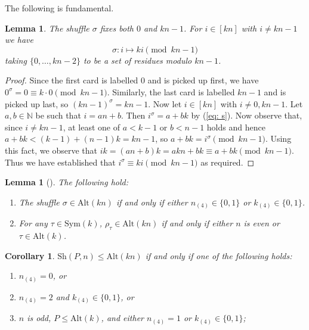 \documentclass[12pt]{amsart}
\newtheorem{cor}[thm]{Corollary}
\newtheorem{lem}[thm]{Lemma}
\theoremstyle{remark}
\theoremstyle{definition}
\newcommand{\sym}{\mathrm{Sym}}
\newcommand{\alt}{\mathrm{Alt}}
\newcommand{\sh}{\mathrm{Sh}}
\begin{document}

The following is fundamental.

\begin{lem} \cite[Proposition 1]{MM} \label{lem:shuffle acts}
The shuffle $\sigma$ fixes both $0$ and $kn-1$. For $i \in [kn]$ with $i \neq kn-1$ we have
 \[ \sigma : i \mapsto ki \pmod{kn-1} \]
taking $\{0, \dots, kn-2\}$ to be a set of residues modulo $kn-1$.
\end{lem}

\begin{proof}
Since the first card is labelled $0$ and is picked up first, we have $0^\sigma = 0 \equiv k \cdot 0 \pmod{kn-1}$. Similarly, the last card is labelled $kn-1$ and is picked up last, so $(kn-1)^\sigma = kn-1$. Now let $i \in [kn]$ with $i \neq 0, kn-1$. Let $a,b \in \mathbb{N}$ be such that $i = an+b$. Then $i^{\sigma} = a+bk$ by (\ref{eq: s}). Now observe that, since  $i \neq kn-1$, at least one of $a < k-1$ or $b < n-1$ holds and hence $a+bk < (k-1) + (n-1)k = kn-1$, so $a+bk = i^\sigma \pmod{kn-1}$. Using this fact, we observe that $ik = (an+b)k = akn + bk \equiv a + bk \pmod{kn-1}$. Thus we have established that $i^{\sigma} \equiv ki \pmod{kn-1}$ as required.
\end{proof}

\begin{lem}[{\cite[Lemmas 1 and 2]{MM}}]
\label{lem:parity} The following hold:
	\begin{enumerate}
	\item The shuffle $\sigma \in \alt(kn)$ if and only if either $n_{(4)} \in \{0,1\}$ or $k_{(4)} \in \{0,1\}$.
	\item For any $\tau \in \sym(k)$, $\rho_\tau \in \alt(kn)$ if and only if either $n$ is even or $\tau \in \alt(k)$.
	\end{enumerate}
\end{lem}

 
\begin{cor} \label{cor:parity}
$\sh(P,n) \leqslant \alt(kn)$ if and only if one of the following holds:
	\begin{enumerate}
	\item $n_{(4)} = 0$, or
	\item $n_{(4)} = 2$ and $k_{(4)} \in \{0,1\}$, or
	\item $n$ is odd, $P \leqslant \alt(k)$, and either $n_{(4)} = 1$ or $k_{(4)} \in \{0,1\}$;
	\end{enumerate}
\end{cor}
 
\end{document}
